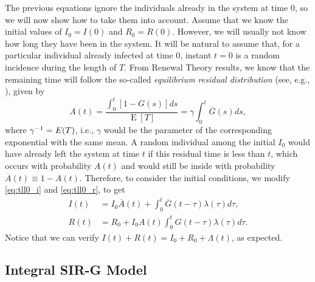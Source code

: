 \documentclass[USenglish,10pt]{article}
\newcommand{\Ab}{\overline{A}\xspace}
\newcommand{\Gb}{\overline{G}\xspace}
\newcommand{\gami}{\ensuremath\gamma^{-1}\xspace}
\DeclareMathOperator{\Exp}{E}       %
\begin{document}
The previous equations ignore the individuals already in the system at time $0$, so we will now show how to take them into account.
Assume that we know the initial values of $I_0=I(0)$ and $R_0=R(0)$.
However, we will usually not know how long they have been in the system.
It will be natural to assume that, for a particular individual already infected at time $0$, instant $t=0$ is a random incidence during the length of $T$. From Renewal Theory results, we know that the remaining time will follow the so-called \emph{equilibrium residual distribution} (see, e.g., \cite{kulk95}), given by
\begin{equation}
A(t) =  \frac{\int_0^t[1-G(s)]ds}{\Exp{[T]}} = \gamma \int_0^t \Gb(s)ds,
\label{eq:eqdist}
\end{equation}
where $\gami=E(T)$, i.e., $\gamma$ would be the parameter of the corresponding exponential with the same mean. A random individual among the initial $I_0$ would have already left the system at time $t$ if this residual time is less than $t$, which occurs with probability $A(t)$ and would still be inside with probability $\Ab(t)\equiv 1- A(t)$. Therefore, to consider the initial conditions, we modify \eqref{eq:tll0_i} and \eqref{eq:tll0_r}, to get
\begin{align}
I(t) &= I_0\Ab(t) +  \int_0^t \Gb(t-\tau) \lambda(\tau)d\tau,   \label{eq:tll0_i_ic} \\
R(t) &= R_0 +  I_0A(t) \int_0^t G(t-\tau) \lambda(\tau)d\tau.  \label{eq:tll0_r_ic}
\end{align}
Notice that we can verify $I(t)+R(t)= I_0 +  R_0  + \Lambda(t)$, as expected.


\subsection{Integral SIR-G Model}
\end{document}
